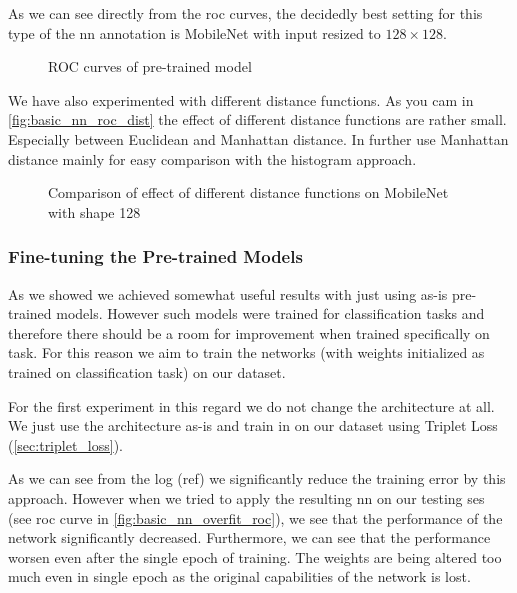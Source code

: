 As we can see directly from the \gls{roc} curves, the decidedly best setting for this type of the \gls{nn} annotation is MobileNet with input resized to $128 \times 128$. 

\begin{figure}
    \centering
    \def\svgwidth{\columnwidth}
    
    \caption{ROC curves of pre-trained model}
    \label{fig:pretrained_nn_roc}
\end{figure}

We have also experimented with different distance functions. As you cam in \autoref{fig:basic_nn_roc_dist} the effect of different distance functions are rather small. Especially between Euclidean and Manhattan distance. In further use Manhattan distance mainly for easy comparison with the histogram approach.

\begin{figure}
    \centering
    \def\svgwidth{\columnwidth}
    
    \caption{Comparison of effect of different distance functions on MobileNet with shape 128}
    \label{fig:basic_nn_roc_dist}
\end{figure}

\subsubsection{Fine-tuning the Pre-trained Models}

As we showed we achieved somewhat useful results with just using as-is pre-trained models. However such models were trained for classification tasks and therefore there should be a room for improvement when trained specifically on \reid{} task. For this reason we aim to train the networks (with weights initialized as trained on classification task) on our dataset.

For the first experiment in this regard we do not change the architecture at all. We just use the architecture as-is and train in on our dataset using Triplet Loss (\autoref{sec:triplet_loss}).

As we can see from the log (ref) we significantly reduce the training error by this approach. However when we tried to apply the resulting \gls{nn} on our testing \gls{ses} (see \gls{roc} curve in \autoref{fig:basic_nn_overfit_roc}), we see that the performance of the network significantly decreased. Furthermore, we can see that the performance worsen even after the single epoch of training. The weights are being altered too much even in single epoch as the original capabilities of the network is lost.

